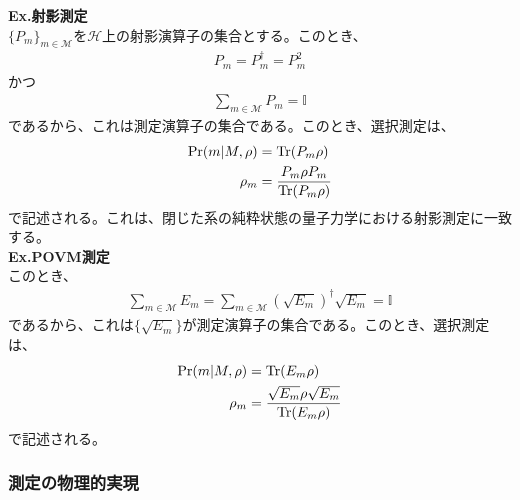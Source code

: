 \documentclass[a4paper,11pt]{jsarticle}
\numberwithin{equation}{section}
\begin{document}
\textbf{Ex.射影測定}\\
$\{P_m\}_{m \in \mathcal{M}}$を$\mathcal{H}$上の射影演算子の集合とする。このとき、
\begin{align}
    P_m = P_m^\dagger = P_m^2
\end{align}
かつ
\begin{align}
    \sum_{m \in \mathcal{M}}P_m = \mathbb{I}
\end{align}
であるから、これは測定演算子の集合である。このとき、選択測定は、
\begin{align}
    \Pr(m|M,\rho) &= \Tr(P_m\rho)\\
    \rho_m &= \frac{P_m\rho P_m}{\Tr(P_m\rho)}
\end{align}
で記述される。これは、閉じた系の純粋状態の量子力学における射影測定に一致する。\\
\textbf{Ex.POVM測定}\\
このとき、
\begin{align}
    \sum_{m \in \mathcal{M}}E_m = \sum_{m \in \mathcal{M}} (\sqrt{E_m})^\dagger\sqrt{E_m} = \mathbb{I}
\end{align}
であるから、これは$\{\sqrt{E_m}\}$が測定演算子の集合である。このとき、選択測定は、
\begin{align}
    \Pr(m|M,\rho) &= \Tr(E_m\rho)\\
    \rho_m &= \frac{\sqrt{E_m}\rho \sqrt{E_m}}{\Tr(E_m\rho)}
\end{align}
で記述される。\\

\subsubsection{測定の物理的実現}
\end{document}
